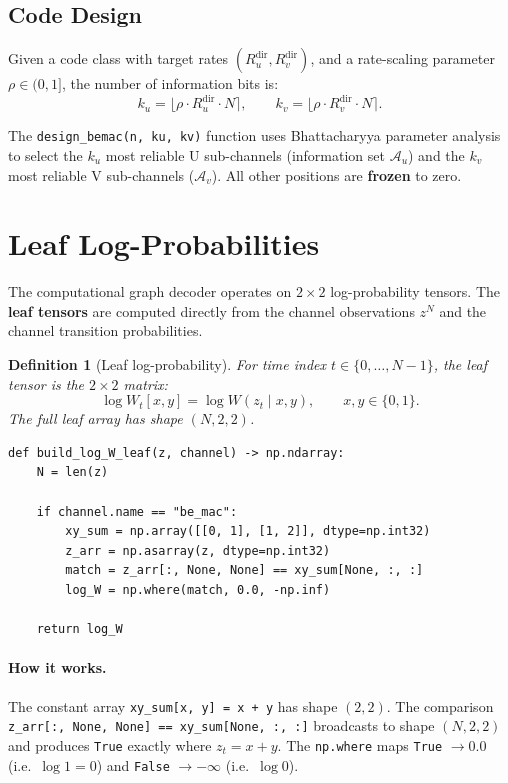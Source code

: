 \documentclass[11pt,a4paper]{article}
\newtheorem{definition}{Definition}[section]
\begin{document}
\subsection{Code Design}

Given a code class with target rates $(R_u^{\mathrm{dir}}, R_v^{\mathrm{dir}})$, and a rate-scaling parameter $\rho \in (0, 1]$, the number of information bits is:
\[
k_u = \lfloor \rho \cdot R_u^{\mathrm{dir}} \cdot N \rceil, \qquad
k_v = \lfloor \rho \cdot R_v^{\mathrm{dir}} \cdot N \rceil.
\]

The \texttt{design\_bemac(n, ku, kv)} function uses Bhattacharyya parameter analysis to select the $k_u$ most reliable U sub-channels (information set $\mathcal{A}_u$) and the $k_v$ most reliable V sub-channels ($\mathcal{A}_v$). All other positions are \textbf{frozen} to zero.


\section{Leaf Log-Probabilities}
\label{sec:leafprob}

The computational graph decoder operates on $2 \times 2$ log-probability tensors. The \textbf{leaf tensors} are computed directly from the channel observations $z^N$ and the channel transition probabilities.

\begin{definition}[Leaf log-probability]
For time index $t \in \{0, \ldots, N-1\}$, the leaf tensor is the $2 \times 2$ matrix:
\[
\log W_t[x, y] = \log W(z_t \mid x, y), \qquad x, y \in \{0, 1\}.
\]
The full leaf array has shape $(N, 2, 2)$.
\end{definition}

\begin{lstlisting}[caption={Building leaf log-probabilities (\texttt{build\_log\_W\_leaf})}]
def build_log_W_leaf(z, channel) -> np.ndarray:
    N = len(z)

    if channel.name == "be_mac":
        xy_sum = np.array([[0, 1], [1, 2]], dtype=np.int32)
        z_arr = np.asarray(z, dtype=np.int32)
        match = z_arr[:, None, None] == xy_sum[None, :, :]
        log_W = np.where(match, 0.0, -np.inf)

    return log_W
\end{lstlisting}

\paragraph{How it works.} The constant array \texttt{xy\_sum[x, y] = x + y} has shape $(2, 2)$. The comparison \texttt{z\_arr[:, None, None] == xy\_sum[None, :, :]} broadcasts to shape $(N, 2, 2)$ and produces \texttt{True} exactly where $z_t = x + y$. The \texttt{np.where} maps \texttt{True} $\to 0.0$ (i.e.\ $\log 1 = 0$) and \texttt{False} $\to -\infty$ (i.e.\ $\log 0$).
\end{document}
